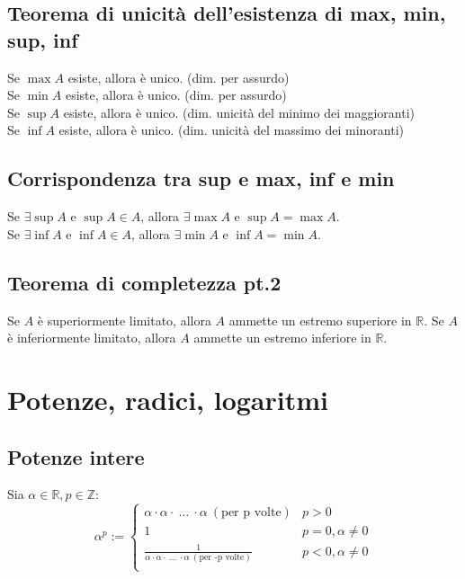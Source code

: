 \documentclass[a4paper]{article}
\begin{document}
\subsection{Teorema di unicità dell'esistenza di max, min, sup, inf}
Se \(\max A\) esiste, allora è unico. (dim. per assurdo) \\
Se \(\min A\) esiste, allora è unico. (dim. per assurdo) \\
Se \(\sup A\) esiste, allora è unico. (dim. unicità del minimo dei maggioranti) \\
Se \(\inf A\) esiste, allora è unico. (dim. unicità del massimo dei minoranti)


\subsection{Corrispondenza tra sup e max, inf e min}
Se \(\exists \sup A\) e \(\sup A \in A\), allora \(\exists \max A\) e \(\sup A = \max A\). \\
Se \(\exists \inf A\) e \(\inf A \in A\), allora \(\exists \min A\) e \(\inf A = \min A\).


\subsection{Teorema di completezza pt.2}
Se \(A\) è superiormente limitato, allora \(A\) ammette un estremo superiore in \(\mathbb{R}\).
Se \(A\) è inferiormente limitato, allora \(A\) ammette un estremo inferiore in \(\mathbb{R}\).


\newpage

\section{Potenze, radici, logaritmi}
\subsection{Potenze intere}
Sia \(\alpha \in \mathbb{R}, p \in \mathbb{Z}\):
\[ \alpha ^ p := 
\begin{cases}
	\alpha \cdot \alpha \cdot \  \dots \  \cdot \alpha \ \left( \text{per p volte} \right) & p > 0 \\
	1 & p = 0, \alpha \neq 0 \\
	\frac{1}{ \alpha \cdot \alpha \cdot \  \dots \  \cdot \alpha \ \left( \text{per -p volte} \right) } & p < 0, \alpha \neq 0 \\
\end{cases}
\]
\end{document}
